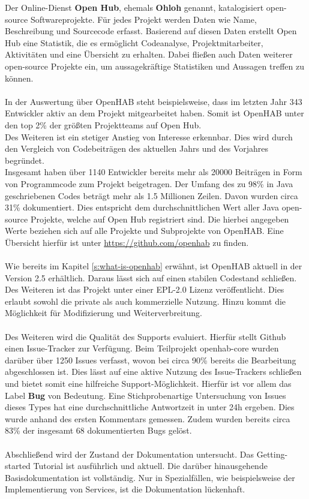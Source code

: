 Der Online-Dienst \textbf{Open Hub}, ehemals \textbf{Ohloh} genannt, katalogisiert open-source Softwareprojekte. Für jedes Projekt werden Daten wie Name, Beschreibung und Sourcecode erfasst. Basierend auf diesen Daten erstellt Open Hub eine Statistik, die es ermöglicht Codeanalyse, Projektmitarbeiter, Aktivitäten und eine Übersicht zu erhalten. Dabei fließen auch Daten weiterer open-source Projekte ein, um aussagekräftige Statistiken und Aussagen treffen zu können.\\
\\
{In der Auswertung über OpenHAB steht beispielsweise, dass im letzten Jahr 343 Entwickler aktiv an dem Projekt mitgearbeitet haben. Somit ist OpenHAB unter den top 2\% der größten Projektteams auf Open Hub.\\
Des Weiteren ist ein stetiger Anstieg von Interesse erkennbar. Dies wird durch den Vergleich von Codebeiträgen des aktuellen Jahrs und des Vorjahres begründet.\\
Insgesamt haben über 1140 Entwickler bereits mehr als 20000 Beiträgen in Form von Programmcode zum Projekt beigetragen. Der Umfang des zu 98\% in Java geschriebenen Codes beträgt mehr als 1.5 Millionen Zeilen. Davon wurden circa 31\% dokumentiert. Dies entspricht dem durchschnittlichen Wert aller Java open-source Projekte, welche auf Open Hub registriert sind.}\cite{OPENHUB01:OH} Die hierbei angegeben Werte beziehen sich auf alle Projekte und Subprojekte von OpenHAB. Eine Übersicht hierfür ist unter \url{https://github.com/openhab} zu finden.\\
\\
Wie bereits im Kapitel \ref{s:what-is-openhab} erwähnt, ist OpenHAB aktuell in der Version 2.5 erhältlich. Daraus lässt sich auf einen stabilen Codestand schließen.\\
Des Weiteren ist das Projekt unter einer EPL-2.0 Lizenz veröffentlicht. Dies erlaubt sowohl die private als auch kommerzielle Nutzung. Hinzu kommt die Möglichkeit für Modifizierung und Weiterverbreitung.\cite{LICENSE01:EC}
\\
\\
Des Weiteren wird die Qualität des Supports evaluiert. Hierfür stellt Github einen Issue-Tracker zur Verfügung. Beim Teilprojekt openhab-core wurden darüber über 1250 Issues verfasst, wovon bei circa 90\% bereits die Bearbeitung abgeschlossen ist.\cite{GITHUB01:OS} Dies lässt auf eine aktive Nutzung des Issue-Trackers schließen und bietet somit eine hilfreiche Support-Möglichkeit. Hierfür ist vor allem das Label \textbf{Bug} von Bedeutung. Eine Stichprobenartige Untersuchung von Issues dieses Types hat eine durchschnittliche Antwortzeit in unter 24h ergeben. Dies wurde anhand des ersten Kommentars gemessen. Zudem wurden bereits circa 83\% der insgesamt 68 dokumentierten Bugs gelöst.
\\
\\
Abschließend wird der Zustand der Dokumentation untersucht.
Das Getting-started Tutorial ist ausführlich und aktuell. Die darüber hinausgehende Basisdokumentation ist vollständig. Nur in Spezialfällen, wie beispielsweise der Implementierung von Services, ist die Dokumentation lückenhaft.\cite{OPENHAB01:OH}

